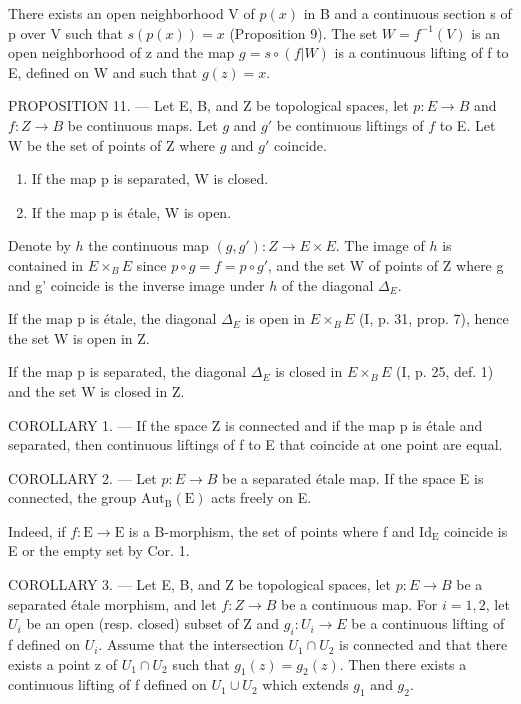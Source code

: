 There exists an open neighborhood V of \(p(x)\) in B and a continuous section s of p over V such that \(s(p(x)) = x\) (Proposition 9). The set \(W = f^{-1}(V)\) is an open neighborhood of z and the map \(g = s \circ (f|W)\) is a continuous lifting of f to E, defined on W and such that \(g(z) = x\).

PROPOSITION 11. --- Let E, B, and Z be topological spaces, let \(p\colon E \to B\) and \(f\colon Z \to B\) be continuous maps. Let \(g\) and \(g'\) be continuous liftings of \(f\) to E. Let W be the set of points of Z where \(g\) and \(g'\) coincide.

\begin{enumerate}
\def\labelenumi{\alph{enumi})}
\item
  If the map p is separated, W is closed.
\item
  If the map p is étale, W is open.
\end{enumerate}

Denote by \(h\) the continuous map \((g, g')\colon Z \to E \times E\). The image of \(h\) is contained in \(E \times_{B} E\) since \(p \circ g = f = p \circ g'\), and the set W of points of Z where g and g' coincide is the inverse image under \(h\) of the diagonal \(\Delta_{E}\).

If the map p is étale, the diagonal \(\Delta_{E}\) is open in \(E \times_{B} E\) (I, p. 31, prop. 7), hence the set W is open in Z.

If the map p is separated, the diagonal \(\Delta_{E}\) is closed in \(E \times_{B} E\) (I, p. 25, def. 1) and the set W is closed in Z.

COROLLARY 1. --- If the space Z is connected and if the map p is étale and separated, then continuous liftings of f to E that coincide at one point are equal.

COROLLARY 2. --- Let \(p\colon E \to B\) be a separated étale map. If the space E is connected, the group \(\mathrm{Aut}_{\mathrm{B}}(\mathrm{E})\) acts freely on E.

Indeed, if \(f: \mathrm{E} \to \mathrm{E}\) is a B-morphism, the set of points where f and \(\mathrm{Id}_{\mathrm{E}}\) coincide is E or the empty set by Cor. 1.

COROLLARY 3. --- Let E, B, and Z be topological spaces, let \(p\colon E \to B\) be a separated étale morphism, and let \(f\colon Z \to B\) be a continuous map. For \(i = 1,2\), let \(U_i\) be an open (resp. closed) subset of Z and \(g_i\colon U_i \to E\) be a continuous lifting of f defined on \(U_i\). Assume that the intersection \(U_1 \cap U_2\) is connected and that there exists a point z of \(U_1 \cap U_2\) such that \(g_1(z) = g_2(z)\). Then there exists a continuous lifting of f defined on \(U_1 \cup U_2\) which extends \(g_1\) and \(g_2\).

